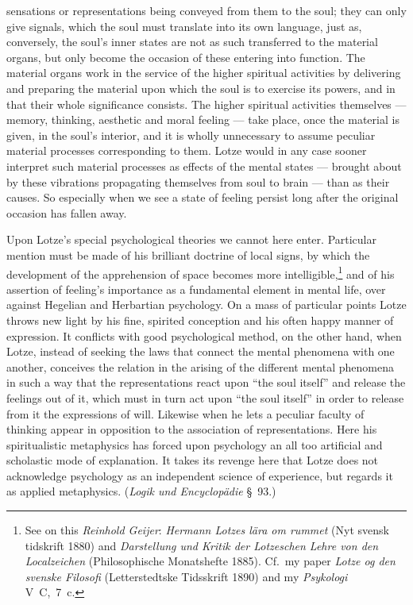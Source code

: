 \documentclass[12pt,a4paper]{book}
\newcommand{\opage}[1]{\marginnote{\footnotesize\textit{[#1]}}}
\begin{document}
sensations or representations being conveyed from them to the soul; they can only
give signals, which the soul must translate into its own language, just as,
conversely, the soul's inner states are not as such transferred to the material
organs, but only become the occasion of these entering into function. The
material organs work in the service of the higher spiritual activities by
delivering and preparing the material upon which the soul is to exercise its
powers, and in that their whole significance consists. The higher spiritual
activities themselves --- memory, thinking, aesthetic and moral feeling --- take
place, once the material is given, in the soul's interior, and it is wholly
unnecessary to assume peculiar material processes corresponding to them. Lotze
would in any case sooner interpret such material processes as effects of the
mental states --- brought about by these vibrations propagating themselves from
soul to brain --- than as their causes. So especially when we see a state of
feeling persist long after the original occasion has fallen away.

Upon Lotze's special psychological theories we cannot here enter. Particular
mention must be made of his brilliant doctrine of local signs, by which the
development of the apprehension of space becomes more
intelligible,\footnote{See on this \emph{Reinhold Geijer}: \textit{Hermann Lotzes lära
om rummet} (Nyt svensk tidskrift 1880) and \textit{Darstellung und Kritik der
Lotzeschen Lehre von den Localzeichen} (Philosophische Monatshefte 1885). Cf.\
my paper \textit{Lotze og den svenske Filosofi} (Letterstedtske Tidsskrift 1890)
and my \textit{Psykologi} V~C,~7~c.} and of his assertion of feeling's importance
as a fundamental element in mental life, over against Hegelian and Herbartian
psychology. On a mass of particular points Lotze throws new light by his fine,
spirited conception and his often happy manner of expression. It conflicts with
good psychological method, on the other hand, when Lotze, instead of seeking the
laws that connect the mental phenomena with one another, conceives the relation
in the arising of the different mental phenomena in such a way that the
representations react upon ``the soul itself'' and release the feelings out of
it, which must in turn act upon ``the soul itself'' in order to release from it
the expressions of will. Likewise when he lets a \opage{524}peculiar faculty of thinking
appear in opposition to the association of representations. Here his
spiritualistic metaphysics has forced upon psychology an all too artificial and
scholastic mode of explanation. It takes its revenge here that Lotze does not
acknowledge psychology as an independent science of experience, but regards it as
applied metaphysics. (\textit{Logik und Encyclopädie} §~93.)
\end{document}
